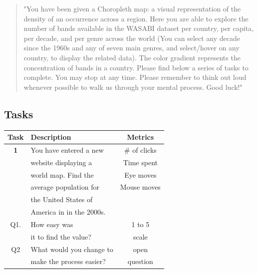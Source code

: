 \documentclass[twocolumn, letterpaper,13pt]{scrartcl}
\begin{document}
    \begin{quote}
        "You have been given a Choropleth map: a visual representation of the density of an occurrence across a region. 
        \newline\newline
        Here you are able to explore the number of bands available in the WASABI dataset per country, per capita, per decade, and per genre across the world (You can select any decade since the 1960s and any of seven main genres, and select/hover on any country, to display the related data). 
        \newline\newline
        The color gradient represents the concentration of bands in a country.
        \newline\newline
        Please find below a series of tasks to complete. You may stop at any time. Please remember to think out loud whenever possible to walk us through your mental process. Good luck!"
    \end{quote}
    
    \subsection*{Tasks}
    
    \begin{center}
    \begin{tabular} { | c | l | c | }
    \hline
     Task & Description & Metrics \\
    \hline
    \textbf{1} & You have entered a new & \# of clicks \\
    & website displaying a & Time spent\\
    & world map. Find the & Eye moves\\
    & average population for & Mouse moves\\
    & the United States of & \\
    & America in in the 2000s.& \\
    \hline
    Q1. & How easy was & 1 to 5\\
    & it to find the value? & scale \\
    \hline
    Q2 & What would you change to & open\\
    & make the process easier? & question\\
    \hline
    \end{tabular}
    \end{center}
\end{document}
